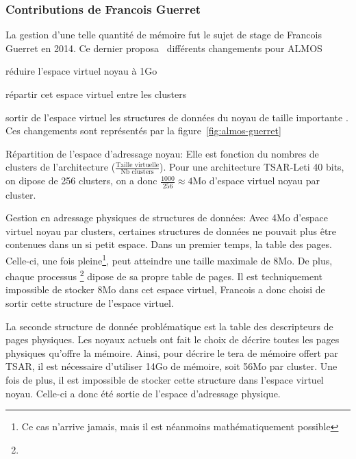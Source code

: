       
    \subsubsection{Contributions de Francois Guerret}
      
      La gestion d'une telle quantité de mémoire fut le sujet de stage de
      Francois Guerret en 2014. Ce dernier
      proposa~\cite{guerret2014exploitation} différents changements pour ALMOS
      \benumline \item réduire l'espace virtuel noyau à 1Go \item répartir cet
      espace virtuel entre les clusters \item sortir de l'espace virtuel les
      structures de données du noyau de taille importante \eenumline. Ces
      changements sont représentés par la figure~\ref{fig:almos-guerret}

      \begin{paragraph}{Répartition de l'espace d'adressage noyau:}
        Elle est fonction du nombres de clusters de l'architecture
        ($\frac{\text{Taille virtuelle}}{\text{Nb clusters}}$). Pour une
        architecture TSAR-Leti 40 bits, on dipose de 256 clusters, on a donc
        $\frac{1000}{256}\approx4$Mo d'espace virtuel noyau par cluster.
      \end{paragraph}
      \begin{paragraph}{Gestion en adressage physiques de structures de données:}
        Avec 4Mo d'espace virtuel noyau par clusters, certaines structures de
        données ne pouvait plus être contenues dans un si petit espace. Dans un
        premier temps, la table des pages. Celle-ci, une fois pleine\footnote{Ce
          cas n'arrive jamais, mais il est néanmoins mathématiquement possible},
        peut atteindre une taille maximale de 8Mo. De plus, chaque
        processus \footnote{}  dipose de sa
        propre table de pages. Il est techniquement impossible de stocker 8Mo
        dans cet espace virtuel, Francois a donc choisi de sortir cette
        structure de l'espace virtuel.

        La seconde structure de donnée problématique est la table des
        descripteurs de pages physiques. Les noyaux actuels ont fait le choix de décrire toutes les pages physiques
        qu'offre la mémoire. Ainsi, pour décrire le tera de mémoire offert par
        TSAR, il est nécessaire d'utiliser 14Go de mémoire, soit 56Mo par cluster. Une
        fois de plus, il est impossible de stocker cette structure dans l'espace
        virtuel noyau. Celle-ci a donc été sortie de l'espace d'adressage
        physique.
      \end{paragraph}


